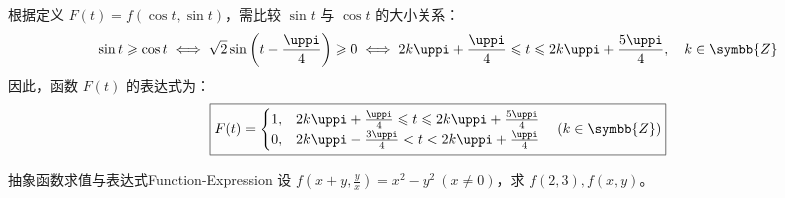 \begin{solution}
    根据定义 $F(t) = f(\cos t, \sin t)$，需比较 $\sin t$ 与 $\cos t$ 的大小关系：
    \begin{equation*}
        \sin t \geqslant \cos t \iff \sqrt{2}\sin\left( t - \frac{\uppi}{4} \right) \geqslant 0 \iff 2k\uppi + \frac{\uppi}{4} \leqslant t \leqslant 2k\uppi + \frac{5\uppi}{4}, \quad k \in \symbb{Z}
    \end{equation*}
    因此，函数 $F(t)$ 的表达式为：
    \begin{equation*}
        \boxed{F(t) = \begin{cases} 1, & 2k\uppi + \frac{\uppi}{4} \leqslant t \leqslant 2k\uppi + \frac{5\uppi}{4} \\ 0, & 2k\uppi - \frac{3\uppi}{4} < t < 2k\uppi + \frac{\uppi}{4} \end{cases} \quad (k \in \symbb{Z})}
    \end{equation*}
\end{solution}

\begin{problem}{抽象函数求值与表达式}{Function-Expression}
    设 $f(x + y, \frac{y}{x}) = x^2 - y^2 \ (x \neq 0)$，求 $f(2, 3), f(x, y)$。
\end{problem}

